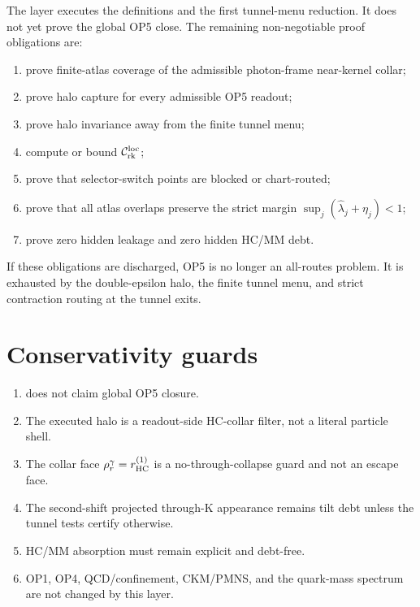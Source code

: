 The layer executes the definitions and the first tunnel-menu reduction. It does not yet prove the global OP5 close. The remaining non-negotiable proof obligations are:
\begin{enumerate}
 \item prove finite-atlas coverage of the admissible photon-frame near-kernel collar;
 \item prove halo capture for every admissible OP5 readout;
 \item prove halo invariance away from the finite tunnel menu;
 \item compute or bound \(\mathcal C_{\mathrm{rk}}^{\mathrm{loc}}\);
 \item prove that selector-switch points are blocked or chart-routed;
 \item prove that all atlas overlaps preserve the strict margin \(\sup_j(\widehat\lambda_j+\eta_j)<1\);
 \item prove zero hidden leakage and zero hidden HC/MM debt.
\end{enumerate}

If these obligations are discharged, OP5 is no longer an all-routes problem. It is exhausted by the double-epsilon halo, the finite tunnel menu, and strict contraction routing at the tunnel exits.

\section{Conservativity guards}

\begin{enumerate}
 \item does not claim global OP5 closure.
 \item The executed halo is a readout-side HC-collar filter, not a literal particle shell.
 \item The collar face \(\rho_{r}^{\gamma}=r_{\mathrm{HC}}^{(1)}\) is a no-through-collapse guard and not an escape face.
 \item The second-shift projected through-K appearance remains tilt debt unless the tunnel tests certify otherwise.
 \item HC/MM absorption must remain explicit and debt-free.
 \item OP1, OP4, QCD/confinement, CKM/PMNS, and the quark-mass spectrum are not changed by this layer.
\end{enumerate}



\clearpage
